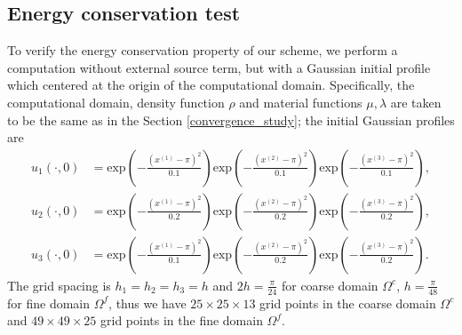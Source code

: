 \subsection{Energy conservation test}\label{conserved_energy}
To verify the energy conservation property of our scheme, we perform a computation without external source term, but with a Gaussian initial profile which centered at the origin of the computational domain.  Specifically, the computational domain, density function $\rho$ and material functions $\mu, \lambda$ are taken to be the same as in the Section \ref{convergence_study}; the initial Gaussian profiles are
\begin{align*}
	u_1(\cdot,0) &= \mbox{exp}\left(-\frac{(x^{(1)}-\pi)^2}{0.1}\right)\mbox{exp}\left(-\frac{(x^{(2)}-\pi)^2}{0.1}\right)\mbox{exp}\left(-\frac{(x^{(3)}-\pi)^2}{0.1}\right),\\
	u_2(\cdot,0) &= \mbox{exp}\left(-\frac{(x^{(1)}-\pi)^2}{0.2}\right)\mbox{exp}\left(-\frac{(x^{(2)}-\pi)^2}{0.2}\right)\mbox{exp}\left(-\frac{(x^{(3)}-\pi)^2}{0.2}\right),\\
	u_3(\cdot,0) &= \mbox{exp}\left(-\frac{(x^{(1)}-\pi)^2}{0.1}\right)\mbox{exp}\left(-\frac{(x^{(2)}-\pi)^2}{0.2}\right)\mbox{exp}\left(-\frac{(x^{(3)}-\pi)^2}{0.2}\right).
\end{align*}
 The grid spacing is $h_1 = h_2 = h_3 = h$ and $2h = \frac{\pi}{24}$ for coarse domain $\Omega^c$, $h = \frac{\pi}{48}$ for fine domain $\Omega^f$, thus we have $25\times25\times13$ grid points in the coarse domain $\Omega^c$ and $49\times49\times25$ grid points in the fine domain $\Omega^f$. 

